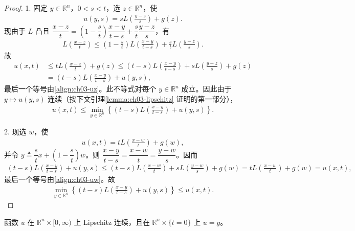 \documentclass[../../main.tex]{subfiles}
\begin{document}
\begin{proof}
1. 固定 $y\in\mathbb{R}^n$，$0<s<t$，选 $z\in\mathbb{R}^n$，使
\begin{align}\label{align:ch03-uz}
u(y,s)=sL\!\left(\frac{y-z}{s}\right)+g(z).
\end{align}
现由于 $L$ 凸且 $\dfrac{x-z}{t}=\left(1-\dfrac{s}{t}\right)\dfrac{x-y}{t-s}+\dfrac{s}{t}\dfrac{y-z}{s}$，有
\begin{align*}
L\!\left(\frac{x-z}{t}\right)\leqslant\left(1-\frac{s}{t}\right)L\!\left(\frac{x-y}{t-s}\right)+\frac{s}{t}L\!\left(\frac{y-z}{s}\right).
\end{align*}
故
\begin{align*}
u(x,t)&\leqslant tL\!\left(\frac{x-z}{t}\right)+g(z)\leqslant(t-s)L\!\left(\frac{x-y}{t-s}\right)+sL\!\left(\frac{y-z}{s}\right)+g(z)\\
&=(t-s)L\!\left(\frac{x-y}{t-s}\right)+u(y,s),
\end{align*}
最后一个等号由\eqref{align:ch03-uz}。此不等式对每个 $y\in\mathbb{R}^n$ 成立。因此由于 $y\mapsto u(y,s)$ 连续（按下文引理\cref{lemma:ch03-lipschitz} 证明的第一部分），
\begin{align}\label{align:ch03-semigroup-ineq1}
u(x,t)\leqslant\min_{y\in\mathbb{R}^n}\left\{(t-s)L\!\left(\frac{x-y}{t-s}\right)+u(y,s)\right\}.
\end{align}

2. 现选 $w$，使
\begin{align}\label{align:ch03-uw}
u(x,t)=tL\!\left(\frac{x-w}{t}\right)+g(w),
\end{align}
并令 $y\triangleq\dfrac{s}{t}x+\left(1-\dfrac{s}{t}\right)w$。则 $\dfrac{x-y}{t-s}=\dfrac{x-w}{t}=\dfrac{y-w}{s}$。因而
\begin{align*}
(t-s)L\!\left(\frac{x-y}{t-s}\right)+u(y,s)
\leqslant(t-s)L\!\left(\frac{x-w}{t}\right)+sL\!\left(\frac{y-w}{s}\right)+g(w)
=tL\!\left(\frac{x-w}{t}\right)+g(w)=u(x,t),
\end{align*}
最后一个等号由\eqref{align:ch03-uw}。故
\begin{align}\label{align:ch03-semigroup-ineq2}
\min_{y\in\mathbb{R}^n}\left\{(t-s)L\!\left(\frac{x-y}{t-s}\right)+u(y,s)\right\}\leqslant u(x,t).
\end{align}
\end{proof}

\begin{lemma}\label{lemma:ch03-lipschitz}函数 $u$ 在 $\mathbb{R}^n\times[0,\infty)$ 上 Lipschitz 连续，且在 $\mathbb{R}^n\times\{t=0\}$ 上 $u=g$。
\end{lemma}
\end{document}
